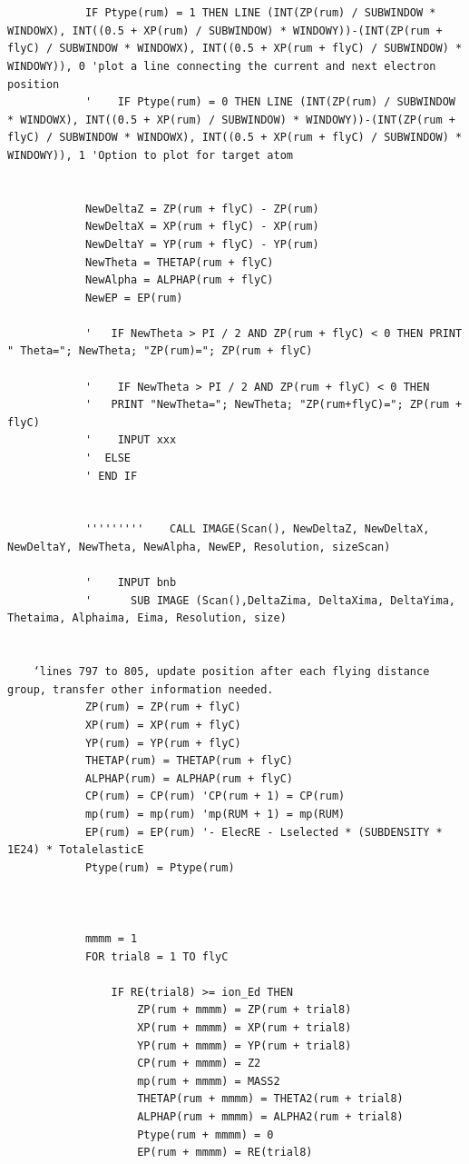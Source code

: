 \documentclass[10pt, reqno]{exam}
\begin{document}
\begin{verbatim}
    
    
            IF Ptype(rum) = 1 THEN LINE (INT(ZP(rum) / SUBWINDOW * WINDOWX), INT((0.5 + XP(rum) / SUBWINDOW) * WINDOWY))-(INT(ZP(rum + flyC) / SUBWINDOW * WINDOWX), INT((0.5 + XP(rum + flyC) / SUBWINDOW) * WINDOWY)), 0 'plot a line connecting the current and next electron position
            '    IF Ptype(rum) = 0 THEN LINE (INT(ZP(rum) / SUBWINDOW * WINDOWX), INT((0.5 + XP(rum) / SUBWINDOW) * WINDOWY))-(INT(ZP(rum + flyC) / SUBWINDOW * WINDOWX), INT((0.5 + XP(rum + flyC) / SUBWINDOW) * WINDOWY)), 1 'Option to plot for target atom
    
    
            NewDeltaZ = ZP(rum + flyC) - ZP(rum)
            NewDeltaX = XP(rum + flyC) - XP(rum)
            NewDeltaY = YP(rum + flyC) - YP(rum)
            NewTheta = THETAP(rum + flyC)
            NewAlpha = ALPHAP(rum + flyC)
            NewEP = EP(rum)
    
            '   IF NewTheta > PI / 2 AND ZP(rum + flyC) < 0 THEN PRINT " Theta="; NewTheta; "ZP(rum)="; ZP(rum + flyC)
    
            '    IF NewTheta > PI / 2 AND ZP(rum + flyC) < 0 THEN
            '   PRINT "NewTheta="; NewTheta; "ZP(rum+flyC)="; ZP(rum + flyC)
            '    INPUT xxx
            '  ELSE
            ' END IF
    
    
            '''''''''    CALL IMAGE(Scan(), NewDeltaZ, NewDeltaX, NewDeltaY, NewTheta, NewAlpha, NewEP, Resolution, sizeScan)
    
            '    INPUT bnb
            '      SUB IMAGE (Scan(),DeltaZima, DeltaXima, DeltaYima, Thetaima, Alphaima, Eima, Resolution, size)
    
    
    ‘lines 797 to 805, update position after each flying distance group, transfer other information needed.  
            ZP(rum) = ZP(rum + flyC)
            XP(rum) = XP(rum + flyC)
            YP(rum) = YP(rum + flyC)
            THETAP(rum) = THETAP(rum + flyC)
            ALPHAP(rum) = ALPHAP(rum + flyC)
            CP(rum) = CP(rum) 'CP(rum + 1) = CP(rum)
            mp(rum) = mp(rum) 'mp(RUM + 1) = mp(RUM)
            EP(rum) = EP(rum) '- ElecRE - Lselected * (SUBDENSITY * 1E24) * TotalelasticE
            Ptype(rum) = Ptype(rum)
    
    
    
            mmmm = 1
            FOR trial8 = 1 TO flyC
    
                IF RE(trial8) >= ion_Ed THEN
                    ZP(rum + mmmm) = ZP(rum + trial8)
                    XP(rum + mmmm) = XP(rum + trial8)
                    YP(rum + mmmm) = YP(rum + trial8)
                    CP(rum + mmmm) = Z2
                    mp(rum + mmmm) = MASS2
                    THETAP(rum + mmmm) = THETA2(rum + trial8)
                    ALPHAP(rum + mmmm) = ALPHA2(rum + trial8)
                    Ptype(rum + mmmm) = 0
                    EP(rum + mmmm) = RE(trial8)
    

\end{verbatim}
\end{document}

